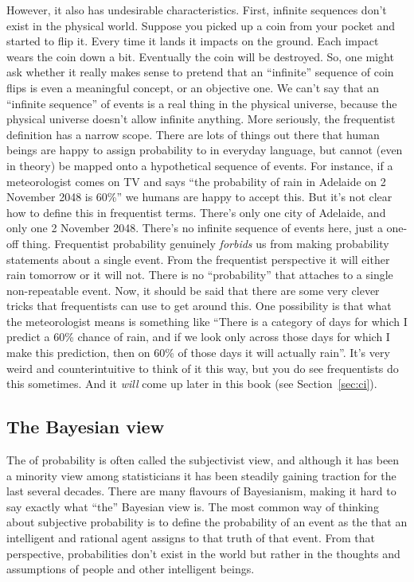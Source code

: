However, it also has undesirable characteristics. First, infinite sequences don't exist in the physical world. Suppose you picked up a coin from your pocket and started to flip it. Every time it lands it impacts on the ground. Each impact wears the coin down a bit. Eventually the coin will be destroyed. So, one might ask whether it really makes sense to pretend that an ``infinite'' sequence of coin flips is even a meaningful concept, or an objective one. We can't say that an ``infinite sequence'' of events is a real thing in the physical universe, because the physical universe doesn't allow infinite anything.  More seriously, the frequentist definition has a narrow scope. There are lots of things out there that human beings are happy to assign probability to in everyday language, but cannot (even in theory) be mapped onto a hypothetical sequence of events. For instance, if a meteorologist comes on TV and says ``the probability of rain in Adelaide on 2 November 2048 is 60\%'' we humans are happy to accept this. But it's not clear how to define this in frequentist terms. There's only one city of Adelaide, and only one 2 November 2048. There's no infinite sequence of events here, just a one-off thing. Frequentist probability genuinely {\it forbids} us from making probability statements about a single event. From the frequentist perspective it will either rain tomorrow or it will not. There is no ``probability'' that attaches to a single non-repeatable event. Now, it should be said that there are some very clever tricks that frequentists can use to get around this. One possibility is that what the meteorologist means is something like ``There is a category of days for which I predict a 60\% chance of rain, and if we look only across those days for which I make this prediction, then on 60\% of those days it will actually rain''. It's very weird and counterintuitive to think of it this way, but you do see frequentists do this sometimes. And it {\it will} come up later in this book (see Section~\ref{sec:ci}).

\subsection{The Bayesian view}

The  of probability is often called the subjectivist view, and although it has been a minority view among statisticians it has been steadily gaining traction for the last several decades. There are many flavours of Bayesianism, making it hard to say exactly what ``the'' Bayesian view is. The most common way of thinking about subjective probability is to define the probability of an event as the  that an intelligent and rational agent assigns to that truth of that event. From that perspective, probabilities don't exist in the world but rather in the thoughts and assumptions of people and other intelligent beings.

